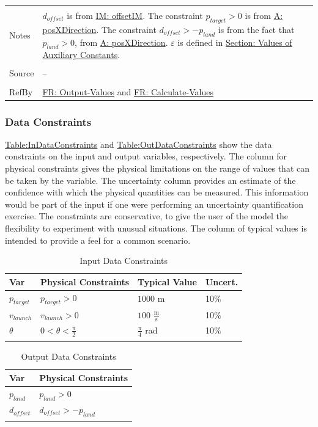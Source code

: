 \documentclass[12pt]{article}
\begin{document}
\begin{minipage}{\textwidth}
\begin{tabular}{>{\raggedright}p{}>{\raggedright\arraybackslash}p{}}
\\ \midrule \\
Notes & ${d_{offset}}$ is from \hyperref[IM:offsetIM]{IM: offsetIM}.
        The constraint ${p_{target}}>0$ is from \hyperref[posXDirection]{A: posXDirection}.
        The constraint ${d_{offset}}>-{p_{land}}$ is from the fact that ${p_{land}}>0$, from \hyperref[posXDirection]{A: posXDirection}.
        $ε$ is defined in \hyperref[Sec:AuxConstants]{Section: Values of Auxiliary Constants}.
\\ \midrule \\
Source & --
\\ \midrule \\
RefBy & \hyperref[outputValues]{FR: Output-Values} and \hyperref[calcValues]{FR: Calculate-Values}
\\ \bottomrule
\end{tabular}
\end{minipage}
\subsubsection{Data Constraints}
\label{Sec:DataConstraints}
\hyperref[Table:InDataConstraints]{Table:InDataConstraints} and \hyperref[Table:OutDataConstraints]{Table:OutDataConstraints} show the data constraints on the input and output variables, respectively. The column for physical constraints gives the physical limitations on the range of values that can be taken by the variable. The uncertainty column provides an estimate of the confidence with which the physical quantities can be measured. This information would be part of the input if one were performing an uncertainty quantification exercise. The constraints are conservative, to give the user of the model the flexibility to experiment with unusual situations. The column of typical values is intended to provide a feel for a common scenario.
\begin{longtable}{l l l l}
\toprule
\textbf{Var} & \textbf{Physical Constraints} & \textbf{Typical Value} & \textbf{Uncert.}
\\
\midrule
\endhead
${p_{target}}$ & ${p_{target}}>0$ & $1000$ m & 10$\%$
\\
${v_{launch}}$ & ${v_{launch}}>0$ & $100$ $\frac{\text{m}}{\text{s}}$ & 10$\%$
\\
$θ$ & $0<θ<\frac{π}{2}$ & $\frac{π}{4}$ rad & 10$\%$
\\
\bottomrule
\caption{Input Data Constraints}
\label{Table:InDataConstraints}
\end{longtable}
\begin{longtable}{l l}
\toprule
\textbf{Var} & \textbf{Physical Constraints}
\\
\midrule
\endhead
${p_{land}}$ & ${p_{land}}>0$
\\
${d_{offset}}$ & ${d_{offset}}>-{p_{land}}$
\\
\bottomrule
\caption{Output Data Constraints}
\label{Table:OutDataConstraints}
\end{longtable}
\end{document}
